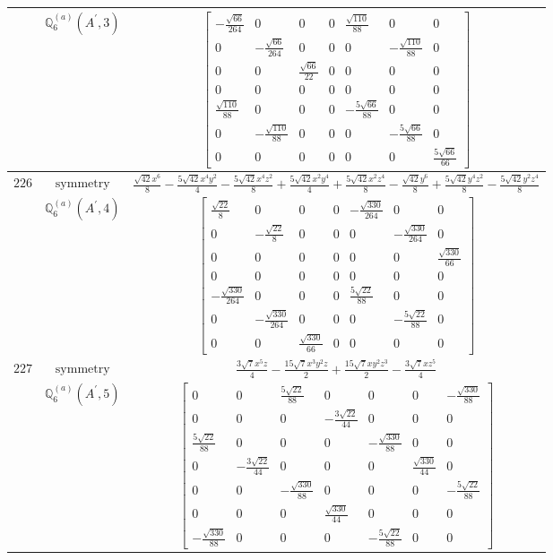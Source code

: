\documentclass[fleqn,8pt,landscape]{jsarticle}
\begin{document}
\begin{longtable}{ccc}
$  $ & $ \mathbb{Q}_{6}^{(a)}(A^{\prime},3) $ & $ \begin{bmatrix} - \frac{\sqrt{66}}{264} & 0 & 0 & 0 & \frac{\sqrt{110}}{88} & 0 & 0 \\ 0 & - \frac{\sqrt{66}}{264} & 0 & 0 & 0 & - \frac{\sqrt{110}}{88} & 0 \\ 0 & 0 & \frac{\sqrt{66}}{22} & 0 & 0 & 0 & 0 \\ 0 & 0 & 0 & 0 & 0 & 0 & 0 \\ \frac{\sqrt{110}}{88} & 0 & 0 & 0 & - \frac{5 \sqrt{66}}{88} & 0 & 0 \\ 0 & - \frac{\sqrt{110}}{88} & 0 & 0 & 0 & - \frac{5 \sqrt{66}}{88} & 0 \\ 0 & 0 & 0 & 0 & 0 & 0 & \frac{5 \sqrt{66}}{66} \end{bmatrix} $ \\ \hline
$ 226 $ & $ \text{symmetry} $ & $ \frac{\sqrt{42} x^{6}}{8} - \frac{5 \sqrt{42} x^{4} y^{2}}{4} - \frac{5 \sqrt{42} x^{4} z^{2}}{8} + \frac{5 \sqrt{42} x^{2} y^{4}}{4} + \frac{5 \sqrt{42} x^{2} z^{4}}{8} - \frac{\sqrt{42} y^{6}}{8} + \frac{5 \sqrt{42} y^{4} z^{2}}{8} - \frac{5 \sqrt{42} y^{2} z^{4}}{8} $ \\
$  $ & $ \mathbb{Q}_{6}^{(a)}(A^{\prime},4) $ & $ \begin{bmatrix} \frac{\sqrt{22}}{8} & 0 & 0 & 0 & - \frac{\sqrt{330}}{264} & 0 & 0 \\ 0 & - \frac{\sqrt{22}}{8} & 0 & 0 & 0 & - \frac{\sqrt{330}}{264} & 0 \\ 0 & 0 & 0 & 0 & 0 & 0 & \frac{\sqrt{330}}{66} \\ 0 & 0 & 0 & 0 & 0 & 0 & 0 \\ - \frac{\sqrt{330}}{264} & 0 & 0 & 0 & \frac{5 \sqrt{22}}{88} & 0 & 0 \\ 0 & - \frac{\sqrt{330}}{264} & 0 & 0 & 0 & - \frac{5 \sqrt{22}}{88} & 0 \\ 0 & 0 & \frac{\sqrt{330}}{66} & 0 & 0 & 0 & 0 \end{bmatrix} $ \\ \hline
$ 227 $ & $ \text{symmetry} $ & $ \frac{3 \sqrt{7} x^{5} z}{4} - \frac{15 \sqrt{7} x^{3} y^{2} z}{2} + \frac{15 \sqrt{7} x y^{2} z^{3}}{2} - \frac{3 \sqrt{7} x z^{5}}{4} $ \\
$  $ & $ \mathbb{Q}_{6}^{(a)}(A^{\prime},5) $ & $ \begin{bmatrix} 0 & 0 & \frac{5 \sqrt{22}}{88} & 0 & 0 & 0 & - \frac{\sqrt{330}}{88} \\ 0 & 0 & 0 & - \frac{3 \sqrt{22}}{44} & 0 & 0 & 0 \\ \frac{5 \sqrt{22}}{88} & 0 & 0 & 0 & - \frac{\sqrt{330}}{88} & 0 & 0 \\ 0 & - \frac{3 \sqrt{22}}{44} & 0 & 0 & 0 & \frac{\sqrt{330}}{44} & 0 \\ 0 & 0 & - \frac{\sqrt{330}}{88} & 0 & 0 & 0 & - \frac{5 \sqrt{22}}{88} \\ 0 & 0 & 0 & \frac{\sqrt{330}}{44} & 0 & 0 & 0 \\ - \frac{\sqrt{330}}{88} & 0 & 0 & 0 & - \frac{5 \sqrt{22}}{88} & 0 & 0 \end{bmatrix} $ \\ \hline

\end{longtable}
\end{document}
